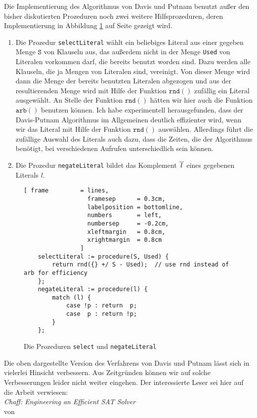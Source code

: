 Die Implementierung des Algorithmus von Davis und Putnam benutzt außer den bisher diskutierten Prozeduren
noch zwei weitere Hilfsprozeduren, deren Implementierung in 
Abbildung \ref{fig:solve-aux} auf Seite \pageref{fig:solve-aux} gezeigt wird.
\begin{enumerate}
\item Die Prozedur \texttt{selectLiteral} wählt ein beliebiges Literal aus 
      einer gegeben Menge $\texttt{S}$ von Klauseln aus, das außerdem nicht in der Menge
      \texttt{Used} von Literalen vorkommen darf, die bereits benutzt worden sind.
      Dazu werden alle Klauseln, die ja Mengen von Literalen sind, vereinigt.  Von dieser
      Menge wird dann die Menge der bereits benutzten Literalen abgezogen und aus der
      resultierenden Menge wird mit Hilfe der Funktion $\texttt{rnd}()$ zufällig ein Literal
      ausgewählt.  An Stelle der Funktion $\texttt{rnd}()$ hätten wir hier auch die Funktion 
      $\texttt{arb}()$ benutzen können.   Ich habe experimentell herausgefunden, dass
      der Davis-Putnam Algorithmus im Allgemeinen deutlich effizienter wird,  wenn wir das Literal
      mit Hilfe der Funktion $\texttt{rnd}()$ auswählen.  Allerdings führt die zufällige Auswahl des Literals
      auch dazu, dass die Zeiten, die der Algorithmus benötigt, bei verschiedenen Aufrufen unterschiedlich sein
      können. 
\item Die Prozedur \texttt{negateLiteral} bildet das Komplement $\overline{\,l\,}$ 
      eines gegebenen Literals $l$.  
\end{enumerate}
\begin{figure}[!ht]
  \centering
\begin{Verbatim}[ frame         = lines, 
                  framesep      = 0.3cm, 
                  labelposition = bottomline,
                  numbers       = left,
                  numbersep     = -0.2cm,
                  xleftmargin   = 0.8cm,
                  xrightmargin  = 0.8cm
                ]
    selectLiteral := procedure(S, Used) {
        return rnd({} +/ S - Used);  // use rnd instead of arb for efficiency
    };
    negateLiteral := procedure(l) {
        match (l) {
            case !p : return  p;
            case  p : return !p;
        }
    };
\end{Verbatim}
\vspace*{-0.3cm}
  \caption{Die Prozeduren \texttt{select} und \texttt{negateLiteral}}
  \label{fig:solve-aux}
\end{figure}

Die oben dargestellte Version des Verfahrens von Davis und Putnam lässt sich in vielerlei
Hinsicht verbessern.  Aus Zeitgründen können wir auf solche Verbesserungen leider nicht
weiter eingehen. Der interessierte Leser sei hier auf die Arbeit \cite{moskewicz01}  verwiesen:
\\[0.2cm]
\hspace*{1.3cm} \textsl{Chaff: Engineering an Efficient SAT Solver} \\
\hspace*{1.3cm} von  


